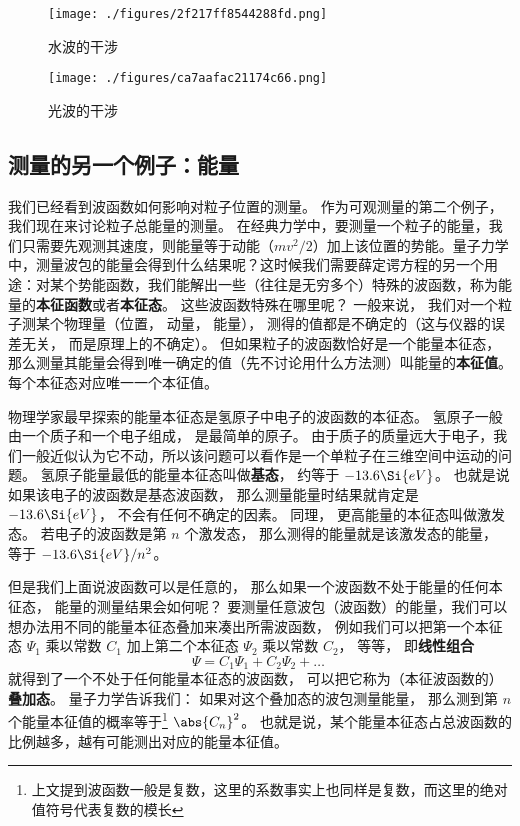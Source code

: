 \begin{figure}[ht]
\centering
\texttt{[image: ./figures/2f217ff8544288fd.png]}
\caption{水波的干涉} \label{fig_QM0_6}
\end{figure}

\begin{figure}[ht]
\centering
\texttt{[image: ./figures/ca7aafac21174c66.png]}
\caption{光波的干涉} \label{fig_QM0_7}
\end{figure}


\subsection{测量的另一个例子：能量}
我们已经看到波函数如何影响对粒子位置的测量。 作为可观测量的第二个例子， 我们现在来讨论粒子总能量的测量。 在经典力学中，要测量一个粒子的能量，我们只需要先观测其速度，则能量等于动能（$mv^2/2$）加上该位置的势能。量子力学中，测量波包的能量会得到什么结果呢？这时候我们需要薛定谔方程的另一个用途：对某个势能函数，我们能解出一些（往往是无穷多个）特殊的波函数，称为能量的\textbf{本征函数}或者\textbf{本征态}。 这些波函数特殊在哪里呢？ 一般来说， 我们对一个粒子测某个物理量（位置， 动量， 能量）， 测得的值都是不确定的（这与仪器的误差无关， 而是原理上的不确定）。 但如果粒子的波函数恰好是一个能量本征态， 那么测量其能量会得到唯一确定的值（先不讨论用什么方法测）叫能量的\textbf{本征值}。 每个本征态对应唯一一个本征值。

物理学家最早探索的能量本征态是氢原子中电子的波函数的本征态。 氢原子一般由一个质子和一个电子组成， 是最简单的原子。 由于质子的质量远大于电子，我们一般近似认为它不动，所以该问题可以看作是一个单粒子在三维空间中运动的问题。 氢原子能量最低的能量本征态叫做\textbf{基态}， 约等于 $-13.6\Si{eV}$。 也就是说如果该电子的波函数是基态波函数， 那么测量能量时结果就肯定是 $-13.6\Si{eV}$， 不会有任何不确定的因素。 同理， 更高能量的本征态叫做激发态。 若电子的波函数是第 $n$ 个激发态， 那么测得的能量就是该激发态的能量， 等于 $-13.6\Si{eV}/n^2$。

但是我们上面说波函数可以是任意的， 那么如果一个波函数不处于能量的任何本征态， 能量的测量结果会如何呢？ 要测量任意波包（波函数）的能量，我们可以想办法用不同的能量本征态叠加来凑出所需波函数， 例如我们可以把第一个本征态 $\Psi_1$ 乘以常数 $C_1$ 加上第二个本征态 $\Psi_2$ 乘以常数 $C_2$， 等等， 即\textbf{线性组合}
\begin{equation}
\Psi = C_1\Psi_1 + C_2\Psi_2 + \dots~
\end{equation}
就得到了一个不处于任何能量本征态的波函数， 可以把它称为（本征波函数的）\textbf{叠加态}。 量子力学告诉我们： 如果对这个叠加态的波包测量能量， 那么测到第 $n$ 个能量本征值的概率等于\footnote{上文提到波函数一般是复数，这里的系数事实上也同样是复数，而这里的绝对值符号代表复数的模长} $\abs{C_n}^2$。 也就是说，某个能量本征态占总波函数的比例越多，越有可能测出对应的能量本征值。

